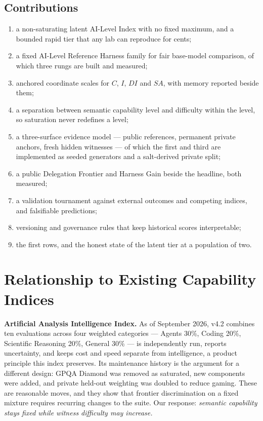 \documentclass[11pt]{article}
\theoremstyle{definition}
\begin{document}
\subsection{Contributions}
\begin{enumerate}[leftmargin=*,itemsep=1pt]
\item a non-saturating latent AI-Level Index with no fixed maximum, and a bounded rapid tier that any lab can reproduce for cents;
\item a fixed AI-Level Reference Harness family for fair base-model comparison, of which three rungs are built and measured;
\item anchored coordinate scales for $C$, $I$, $DI$ and $SA$, with memory reported beside them;
\item a separation between semantic capability level and difficulty within the level, so saturation never redefines a level;
\item a three-surface evidence model --- public references, permanent private anchors, fresh hidden witnesses --- of which the first and third are implemented as seeded generators and a salt-derived private split;
\item a public Delegation Frontier and Harness Gain beside the headline, both measured;
\item a validation tournament against external outcomes and competing indices, and falsifiable predictions;
\item versioning and governance rules that keep historical scores interpretable;
\item the first rows, and the honest state of the latent tier at a population of two.
\end{enumerate}

\section{Relationship to Existing Capability Indices}\label{sec:related}

\textbf{Artificial Analysis Intelligence Index.} As of September 2026, v4.2 combines ten evaluations across four weighted categories --- Agents 30\%, Coding 20\%, Scientific Reasoning 20\%, General 30\% \citep{aa2026index} --- is independently run, reports uncertainty, and keeps cost and speed separate from intelligence, a product principle this index preserves. Its maintenance history is the argument for a different design: GPQA Diamond was removed as saturated, new components were added, and private held-out weighting was doubled to reduce gaming. These are reasonable moves, and they show that frontier discrimination on a fixed mixture requires recurring changes to the suite. Our response: \emph{semantic capability stays fixed while witness difficulty may increase.}
\end{document}
